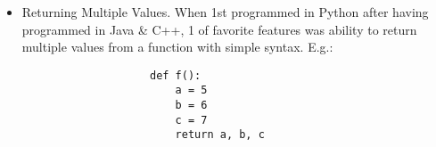 \documentclass{article}
\newtheorem{remark}{Remark}
\begin{document}
\begin{enumerate}
\begin{itemize}
\begin{itemize}
\begin{itemize}
\begin{verbatim}
					In [190]: a = None
					In [191]: def bind_a_variable():
					   .....:     global a
					   .....:     a = []
					   .....: bind_a_variable(a)
					   .....:
					In [192]: print(a)
					[]
				\end{verbatim}
				{\tt nonlocal} allows a function to modify variables defined in a higher-level scope that is not global. Since its use is somewhat esoteric (bí truyền, bí mật) (I never use it in this book), refer to Python documentation to learn more about it.
				\begin{remark}
					Generally discourage use of {\tt global} keyword. Typically, global variables are used to store some kind of state in a system. If fiond yourself using a lot of them, it may indicate a need for object-oriented programming (using classes).
				\end{remark}
				\item {\sf Returning Multiple Values.} When 1st programmed in Python after having programmed in Java \& C++, 1 of favorite features was ability to return multiple values from a function with simple syntax. E.g.:
				\begin{verbatim}
					def f():
					    a = 5
					    b = 6
					    c = 7
					    return a, b, c
					    

\end{verbatim}
\end{itemize}
\end{itemize}
\end{itemize}
\end{enumerate}
\end{document}
